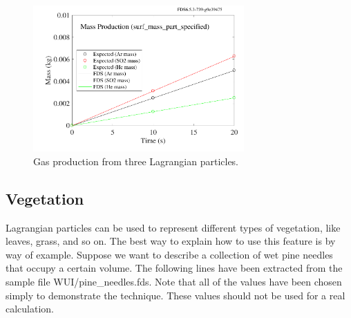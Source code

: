 \documentclass[11pt]{book}
\begin{document}
\begin{figure}[ht]
\begin{center}
\includegraphics[height=2.2in]{SCRIPT_FIGURES/surf_mass_part_specified}
\end{center}
\caption[Example of specified gas mass production from particles]{Gas production from three Lagrangian particles.}
\label{surf_mass_part_specified}
\end{figure}



\subsection{Vegetation}
\label{info:vegetation}

Lagrangian particles can be used to represent different types of vegetation, like leaves, grass, and so on. The best way to explain how to use this feature is by way of example. Suppose we want to describe a collection of wet pine needles that occupy a certain volume. The following lines have been extracted from the sample file {\ct WUI/pine\_needles.fds}. Note that all of the values have been chosen simply to demonstrate the technique. These values should not be used for a real calculation.
\end{document}
